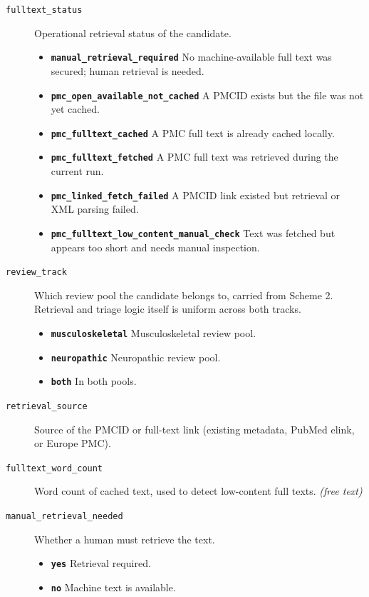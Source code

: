 \documentclass[11pt]{article}
\begin{document}
\begin{description}
\item[\texttt{fulltext\_status}] Operational retrieval status of the candidate.
  \begin{itemize}[leftmargin=1.3em,itemsep=2pt,topsep=2pt]
  \item \textbf{\texttt{manual\_retrieval\_required}} No machine-available full text was secured; human retrieval is needed.
  \item \textbf{\texttt{pmc\_open\_available\_not\_cached}} A PMCID exists but the file was not yet cached.
  \item \textbf{\texttt{pmc\_fulltext\_cached}} A PMC full text is already cached locally.
  \item \textbf{\texttt{pmc\_fulltext\_fetched}} A PMC full text was retrieved during the current run.
  \item \textbf{\texttt{pmc\_linked\_fetch\_failed}} A PMCID link existed but retrieval or XML parsing failed.
  \item \textbf{\texttt{pmc\_fulltext\_low\_content\_manual\_check}} Text was fetched but appears too short and needs manual inspection.
  \end{itemize}
\item[\texttt{review\_track}] Which review pool the candidate belongs to, carried from Scheme 2. Retrieval and triage logic itself is uniform across both tracks.
  \begin{itemize}[leftmargin=1.3em,itemsep=2pt,topsep=2pt]
  \item \textbf{\texttt{musculoskeletal}} Musculoskeletal review pool.
  \item \textbf{\texttt{neuropathic}} Neuropathic review pool.
  \item \textbf{\texttt{both}} In both pools.
  \end{itemize}
\item[\texttt{retrieval\_source}] Source of the PMCID or full-text link (existing metadata, PubMed elink, or Europe PMC).
\item[\texttt{fulltext\_word\_count}] Word count of cached text, used to detect low-content full texts. \textit{(free text)}
\item[\texttt{manual\_retrieval\_needed}] Whether a human must retrieve the text.
  \begin{itemize}[leftmargin=1.3em,itemsep=2pt,topsep=2pt]
  \item \textbf{\texttt{yes}} Retrieval required.
  \item \textbf{\texttt{no}} Machine text is available.

\end{itemize}
\end{description}
\end{document}
